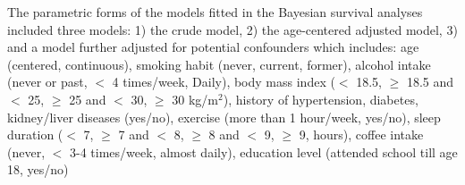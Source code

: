 \documentclass[nutrients,article,submitted,moreauthors,pdftex]{mdpi}
\providecommand{\DIFaddbeginFL}{} %
\newcommand{\DIFaddincludegraphics}[2][]{{\color{blue}\fbox{\DIFOincludegraphics[#1]{#2}}}} %
\DeclareRobustCommand{\DIFaddbeginFL}{\DIFOaddbeginFL \let\includegraphics\DIFaddincludegraphics} %
\begin{document}
The parametric forms of the models fitted in the Bayesian survival
analyses included three models: 1) the crude model, 2) the age-centered
adjusted model, 3) and a model further adjusted for potential
confounders which includes: age (centered, continuous), smoking habit
(never, current, former), alcohol intake (never or past, \(<\) 4
times/week, Daily), body mass index (\(<\) 18.5, \(\geq\) 18.5 and \(<\)
25, \(\geq\) 25 and \(<\) 30, \(\geq\) 30 kg/m\(^2\)), history of
hypertension, diabetes, kidney/liver diseases (yes/no), exercise (more
than 1 hour/week, yes/no), sleep duration (\(<\) 7, \(\geq\) 7 and \(<\)
8, \(\geq\) 8 and \(<\) 9, \(\geq\) 9, hours), coffee intake (never,
\(<\) 3-4 times/week, almost daily), education level (attended school
till age 18, yes/no)

\begin{table}[h]
\DIFaddbeginFL 


\end{table}
\end{document}
